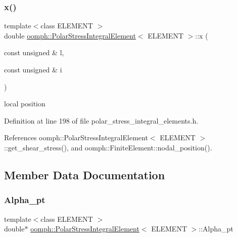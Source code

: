 \subsubsection{\texorpdfstring{x()}{x()}}
{\footnotesize\ttfamily template$<$class E\+L\+E\+M\+E\+NT $>$ \\
double \hyperlink{classoomph_1_1PolarStressIntegralElement}{oomph\+::\+Polar\+Stress\+Integral\+Element}$<$ E\+L\+E\+M\+E\+NT $>$\+::x (\begin{DoxyParamCaption}\item[{const unsigned \&}]{l,  }\item[{const unsigned \&}]{i }\end{DoxyParamCaption})\hspace{0.3cm}{\ttfamily [inline]}}



local position 



Definition at line 198 of file polar\+\_\+stress\+\_\+integral\+\_\+elements.\+h.



References oomph\+::\+Polar\+Stress\+Integral\+Element$<$ E\+L\+E\+M\+E\+N\+T $>$\+::get\+\_\+shear\+\_\+stress(), and oomph\+::\+Finite\+Element\+::nodal\+\_\+position().



\subsection{Member Data Documentation}
\mbox{\label{classoomph_1_1PolarStressIntegralElement_a0e3f523dbdcda0f50f4436f6cd590b94}} 
\subsubsection{\texorpdfstring{Alpha\+\_\+pt}{Alpha\_pt}}
{\footnotesize\ttfamily template$<$class E\+L\+E\+M\+E\+NT $>$ \\
double$\ast$ \hyperlink{classoomph_1_1PolarStressIntegralElement}{oomph\+::\+Polar\+Stress\+Integral\+Element}$<$ E\+L\+E\+M\+E\+NT $>$\+::Alpha\+\_\+pt\hspace{0.3cm}{\ttfamily [protected]}}



